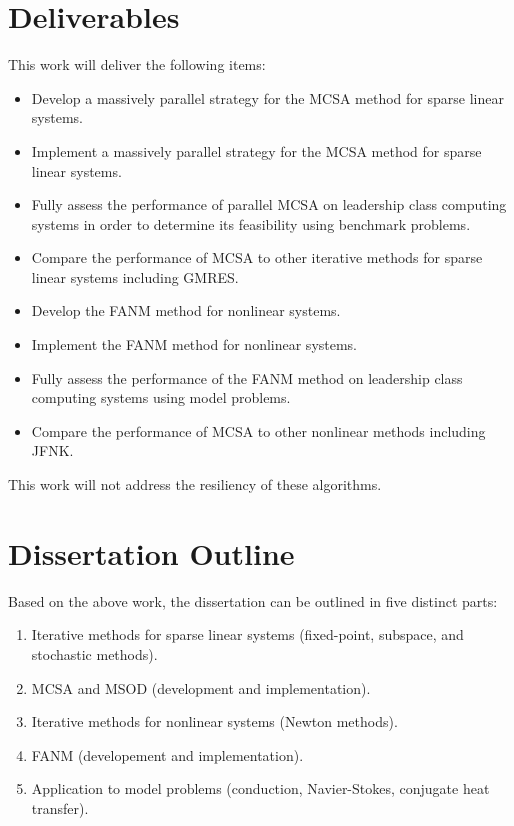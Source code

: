 \documentclass[letterpaper,12pt]{article}
\begin{document}
\section{Deliverables}

This work will deliver the following items:

\begin{itemize}
\item Develop a massively parallel strategy for the MCSA method for
  sparse linear systems.
\item Implement a massively parallel strategy for the MCSA method for
  sparse linear systems.
\item Fully assess the performance of parallel MCSA on leadership class
  computing systems in order to determine its feasibility using
  benchmark problems.
\item Compare the performance of MCSA to other iterative methods for
  sparse linear systems including GMRES.
\item Develop the FANM method for nonlinear systems.
\item Implement the FANM method for nonlinear systems.
\item Fully assess the performance of the FANM method on leadership
  class computing systems using model problems.
\item Compare the performance of MCSA to other nonlinear methods
  including JFNK.
\end{itemize}

This work will not address the resiliency of these algorithms.

\section{Dissertation Outline}

Based on the above work, the dissertation can be outlined in five
distinct parts:

\begin{enumerate}
\item Iterative methods for sparse linear systems (fixed-point,
  subspace, and stochastic methods).
\item MCSA and MSOD (development and implementation).
\item Iterative methods for nonlinear systems (Newton methods).
\item FANM (developement and implementation).
\item Application to model problems (conduction, Navier-Stokes,
  conjugate heat transfer).
\end{enumerate}
\end{document}
